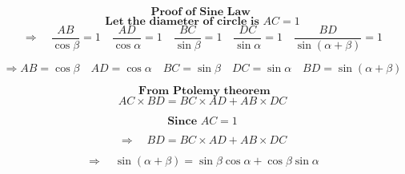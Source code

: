 \documentclass[10pt]{article}
\begin{document}
$$\textbf{Proof of Sine Law } $$
$$ \textbf{Let the diameter of circle is } \mathit{AC} = 1 $$
$$ \Rightarrow \quad \frac{AB}{\cos\beta} = 1 \quad \frac{AD}{\cos\alpha} = 1 \quad \frac{BC}{\sin\beta} = 1 \quad \frac{DC}{\sin\alpha} =1 \quad \frac{BD}{\sin (\alpha + \beta )} = 1$$

$$ \Rightarrow \mathit{AB} = \cos\beta \quad \mathit{AD} = \cos\alpha \quad \mathit{BC} = \sin\beta \quad \mathit{DC} = \sin\alpha  \quad \mathit{BD} = \sin(\alpha + \beta ) $$

$$ \textbf{ From 	Ptolemy theorem} $$
$$ \mathit{AC} \times\mathit{BD} = \mathit{BC}\times \mathit{AD} + \mathit{AB} \times\mathit{DC} $$

$$ \textbf{Since } \mathit{AC} = 1 $$

$$ \Rightarrow \quad \mathit{BD} = \mathit{BC}\times \mathit{AD} + \mathit{AB} \times\mathit{DC} $$

$$ \Rightarrow \quad \sin(\alpha + \beta ) = \sin\beta\cos\alpha + \cos\beta\sin\alpha $$
\end{document}
